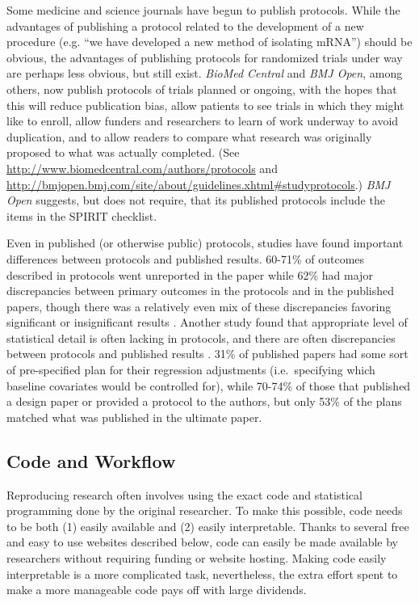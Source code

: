\documentclass[12pt] {article}
\begin{document}
 Some medicine and science journals have begun to publish protocols.   While the
advantages of publishing a protocol related to the development of a new
procedure (e.g. ``we have developed a new method of isolating mRNA'')
should be obvious, the advantages of publishing protocols for randomized
trials under way are perhaps less obvious, but still exist. \emph{BioMed
Central} and \emph{BMJ Open}, among others, now publish protocols of
trials planned or ongoing, with the hopes that this will reduce
publication bias, allow patients to see trials in which they might like
to enroll, allow funders and researchers to learn of work underway to
avoid duplication, and to allow readers to compare what research was
originally proposed to what was actually completed. (See
\url{http://www.biomedcentral.com/authors/protocols} and
\url{http://bmjopen.bmj.com/site/about/guidelines.xhtml\#studyprotocols}.)
\emph{BMJ Open} suggests, but does not require, that its published
protocols include the items in the SPIRIT checklist.

Even in published (or otherwise public) protocols, studies have found
important differences between protocols and published results. 60-71\%
of outcomes described in protocols went unreported in the paper while
62\% had major discrepancies between primary outcomes in the protocols
and in the published papers, though there was a relatively even mix of
these discrepancies favoring significant or insignificant results \citep{chan_a_empirical_2004}. Another study found that appropriate level of
statistical detail is often lacking in protocols, and there are often
discrepancies between protocols and published results \citep{saquib_practices_2013}. 31\% of published papers had some sort of
pre-specified plan for their regression adjustments (i.e.~specifying
which baseline covariates would be controlled for), while 70-74\% of
those that published a design paper or provided a protocol to the
authors, but only 53\% of the plans matched what was published in the
ultimate paper.

\subsection{Code and Workflow}\label{code-and-workflow}

Reproducing research often involves using the exact code and statistical
programming done by the original researcher. To make this possible, code
needs to be both (1) easily available and (2) easily interpretable.
Thanks to several free and easy to use websites described below, code
can easily be made available by researchers without requiring funding or
website hosting. Making code easily interpretable is a more complicated
task, nevertheless, the extra effort spent to make a more manageable
code pays off with large dividends.
\end{document}
